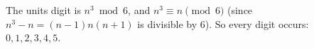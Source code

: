 The units digit is $n^3\bmod6$, and $n^3\equiv n\pmod 6$ (since $n^3-n=(n-1)n(n+1)$ is divisible by $6$). So every digit occurs: $\boxed{0,1,2,3,4,5}$.
